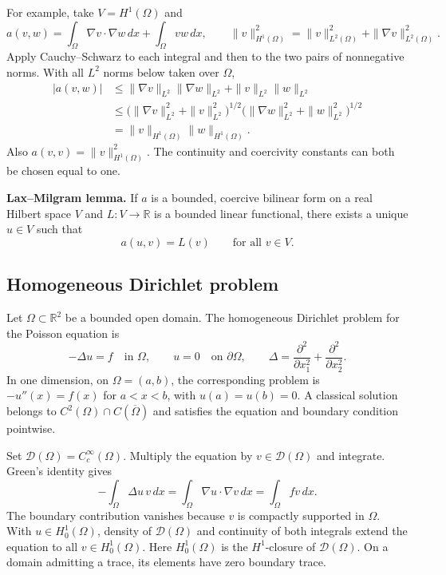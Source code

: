 \documentclass[11pt,a4paper]{article}
\begin{document}
For example, take \(V=H^1(\Omega)\) and
\[
  a(v,w)=\int_\Omega \nabla v\cdot\nabla w\,dx+\int_\Omega vw\,dx,
  \qquad
  \|v\|_{H^1(\Omega)}^2=\|v\|_{L^2(\Omega)}^2+
                             \|\nabla v\|_{L^2(\Omega)}^2.
\]
Apply Cauchy--Schwarz to each integral and then to the two pairs
of nonnegative norms. With all \(L^2\) norms below taken over \(\Omega\),
\begin{align*}
  |a(v,w)|
  &\le \|\nabla v\|_{L^2}\|\nabla w\|_{L^2}
     +\|v\|_{L^2}\|w\|_{L^2}\\
  &\le
  \bigl(\|\nabla v\|_{L^2}^2+\|v\|_{L^2}^2\bigr)^{1/2}
  \bigl(\|\nabla w\|_{L^2}^2+\|w\|_{L^2}^2\bigr)^{1/2}\\
  &=\|v\|_{H^1(\Omega)}\|w\|_{H^1(\Omega)}.
\end{align*}
Also \(a(v,v)=\|v\|_{H^1(\Omega)}^2\). The continuity and
coercivity constants can both be chosen equal to one.

\medskip
\noindent\textbf{Lax--Milgram lemma.}
If \(a\) is a bounded, coercive bilinear form on a real Hilbert
space \(V\) and \(L\colon V\to\mathbb R\) is a bounded linear
functional, there exists a unique \(u\in V\) such that
\[
  a(u,v)=L(v)\qquad \text{for all }v\in V.
\]

\subsection{Homogeneous Dirichlet problem}

Let \(\Omega\subset\mathbb R^2\) be a bounded open domain. The
homogeneous Dirichlet problem for the Poisson equation is
\[
  -\Delta u=f\quad\text{in }\Omega,\qquad
  u=0\quad\text{on }\partial\Omega,\qquad
  \Delta=\frac{\partial^2}{\partial x_1^2}
         +\frac{\partial^2}{\partial x_2^2}.
\]
In one dimension, on \(\Omega=(a,b)\), the corresponding problem
is \(-u''(x)=f(x)\) for \(a<x<b\), with \(u(a)=u(b)=0\).
A classical solution belongs to \(C^2(\Omega)\cap C(\overline\Omega)\)
and satisfies the equation and boundary condition pointwise.

Set \(\mathcal D(\Omega)=C_c^\infty(\Omega)\).
Multiply the equation by \(v\in\mathcal D(\Omega)\) and integrate.
Green's identity gives
\[
  -\int_\Omega \Delta u\,v\,dx
  =\int_\Omega \nabla u\cdot\nabla v\,dx
  =\int_\Omega f v\,dx.
\]
The boundary contribution vanishes because \(v\) is compactly
supported in \(\Omega\). With \(u\in H_0^1(\Omega)\),
density of \(\mathcal D(\Omega)\) and continuity of both
integrals extend the equation to all \(v\in H_0^1(\Omega)\).
Here \(H_0^1(\Omega)\) is the \(H^1\)-closure of \(\mathcal D(\Omega)\).
On a domain admitting a trace, its elements have zero boundary trace.
\end{document}
